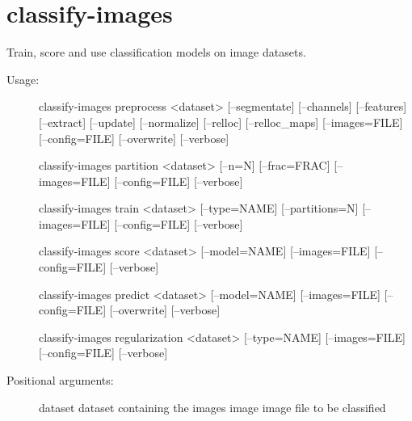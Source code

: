 \documentclass[letterpaper,10pt,english]{sphinxmanual}
\begin{document}
\section{classify-images}
\label{index:classify-images}\label{index:module-flamingo.classify}
Train, score and use classification models on image datasets.
\begin{description}
\item[{Usage:}] \leavevmode
classify-images preprocess \textless{}dataset\textgreater{} {[}--segmentate{]} {[}--channels{]} {[}--features{]} {[}--extract{]} {[}--update{]} {[}--normalize{]} {[}--relloc{]} {[}--relloc\_maps{]} {[}--images=FILE{]} {[}--config=FILE{]} {[}--overwrite{]} {[}--verbose{]}

classify-images partition \textless{}dataset\textgreater{} {[}--n=N{]} {[}--frac=FRAC{]} {[}--images=FILE{]} {[}--config=FILE{]} {[}--verbose{]}

classify-images train \textless{}dataset\textgreater{} {[}--type=NAME{]} {[}--partitions=N{]} {[}--images=FILE{]} {[}--config=FILE{]} {[}--verbose{]}

classify-images score \textless{}dataset\textgreater{} {[}--model=NAME{]} {[}--images=FILE{]} {[}--config=FILE{]} {[}--verbose{]}

classify-images predict \textless{}dataset\textgreater{} {[}--model=NAME{]} {[}--images=FILE{]} {[}--config=FILE{]} {[}--overwrite{]} {[}--verbose{]}

classify-images regularization \textless{}dataset\textgreater{} {[}--type=NAME{]} {[}--images=FILE{]} {[}--config=FILE{]} {[}--verbose{]}

\item[{Positional arguments:}] \leavevmode
dataset            dataset containing the images
image              image file to be classified


\end{description}
\end{document}
